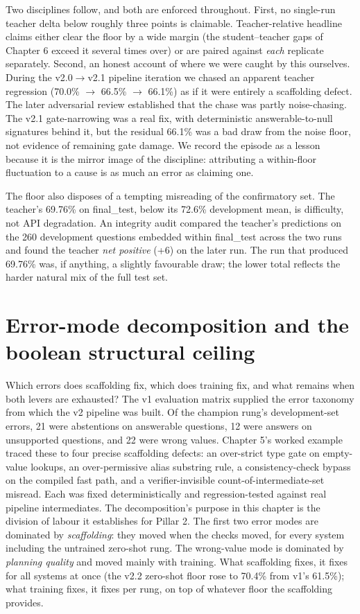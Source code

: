 Two disciplines follow, and both are enforced throughout. First, no single-run teacher delta below roughly three points is claimable. Teacher-relative headline claims either clear the floor by a wide margin (the student--teacher gaps of Chapter 6 exceed it several times over) or are paired against \emph{each} replicate separately. Second, an honest account of where we were caught by this ourselves. During the v2.0$\rightarrow$v2.1 pipeline iteration we chased an apparent teacher regression (70.0\% $\rightarrow$ 66.5\% $\rightarrow$ 66.1\%) as if it were entirely a scaffolding defect. The later adversarial review established that the chase was partly noise-chasing. The v2.1 gate-narrowing was a real fix, with deterministic answerable-to-null signatures behind it, but the residual 66.1\% was a bad draw from the noise floor, not evidence of remaining gate damage. We record the episode as a lesson because it is the mirror image of the discipline: attributing a within-floor fluctuation to a cause is as much an error as claiming one.

The floor also disposes of a tempting misreading of the confirmatory set. The teacher's 69.76\% on final\_test, below its 72.6\% development mean, is difficulty, not API degradation. An integrity audit compared the teacher's predictions on the 260 development questions embedded within final\_test across the two runs and found the teacher \emph{net positive} (+6) on the later run. The run that produced 69.76\% was, if anything, a slightly favourable draw; the lower total reflects the harder natural mix of the full test set.

\section{Error-mode decomposition and the boolean structural ceiling}\label{sec:error-mode-decomposition-and-the-boolean}

Which errors does scaffolding fix, which does training fix, and what remains when both levers are exhausted? The v1 evaluation matrix supplied the error taxonomy from which the v2 pipeline was built. Of the champion rung's development-set errors, 21 were abstentions on answerable questions, 12 were answers on unsupported questions, and 22 were wrong values. Chapter 5's worked example traced these to four precise scaffolding defects: an over-strict type gate on empty-value lookups, an over-permissive alias substring rule, a consistency-check bypass on the compiled fast path, and a verifier-invisible count-of-intermediate-set misread. Each was fixed deterministically and regression-tested against real pipeline intermediates. The decomposition's purpose in this chapter is the division of labour it establishes for Pillar 2. The first two error modes are dominated by \emph{scaffolding}: they moved when the checks moved, for every system including the untrained zero-shot rung. The wrong-value mode is dominated by \emph{planning quality} and moved mainly with training. What scaffolding fixes, it fixes for all systems at once (the v2.2 zero-shot floor rose to 70.4\% from v1's 61.5\%); what training fixes, it fixes per rung, on top of whatever floor the scaffolding provides.

